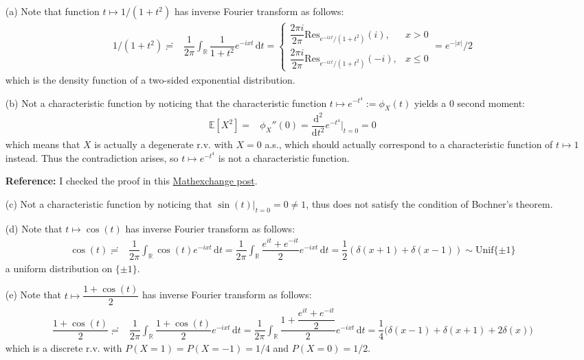 \documentclass[11pt,a4paper]{article}
\numberwithin{equation}{section}%
\begin{document}
\begin{itemize}[topsep=2pt,itemsep=0pt]
    \item[(a)] Note that function $ t\mapsto 1/(1+t^2) $ has inverse Fourier transform as follows:
    \begin{align*}
        1/(1+t^2)\risingdotseq & \dfrac{ 1 }{ 2\pi } \int _\mathbb{R} \dfrac{ 1 }{ 1+t^2 }e^{-ixt}  \,\mathrm{d}t =\begin{cases}
            \dfrac{ 2\pi i }{ 2\pi } \mathrm{ Res }_{e^{-ixt}/(1+t^2)}(i),& x>0\\
            \dfrac{ 2\pi i }{ 2\pi } \mathrm{ Res }_{e^{-ixt}/(1+t^2)}(-i),& x\leq 0
        \end{cases}= e^{-|x|}/2
    \end{align*}
    which is the density function of a two-sided exponential distribution.
    \item[(b)] Not a characteristic function by noticing that the characteristic function $ t\mapsto e^{-t^4} :=\phi_X(t)$ yields a $ 0 $ second moment:
    \begin{align*}
        \mathbb{E}\left[ X^2 \right] = & \phi_X''(0) = \dfrac{ \mathrm{d}^2 }{ \mathrm{d}t^2 }e^{-t^4}\big|_{t=0}=0
    \end{align*}
    which means that $ X $ is actually a degenerate r.v. with $ X=0 $ a.s., which should actually correspond to a characteristic function of $ t\mapsto 1 $ instead. Thus the contradiction arises, so $ t\mapsto e^{-t^4} $ is not a characteristic function.

    \textbf{Reference:} I checked the proof in this \href{https://math.stackexchange.com/questions/1266578/show-that-exp-t4-is-not-a-characteristic-function?noredirect=1&lq=1}{Mathexchange post}.
    
    
    \item[(c)] Not a characteristic function by noticing that $ \sin(t)\big|_{t=0}=0\neq 1 $, thus does not satisfy the condition of Bochner's theorem.
    \item[(d)] Note that $ t\mapsto \cos(t) $ has inverse Fourier transform as follows:
    \begin{align*}
        \cos(t)\risingdotseq & \dfrac{ 1 }{ 2\pi } \int _\mathbb{R} \cos(t)e^{-ixt}  \,\mathrm{d}t =\dfrac{ 1 }{ 2\pi } \int _\mathbb{R} \dfrac{ e^{it}+e^{-it} }{ 2 }e^{-ixt}  \,\mathrm{d}t =\dfrac{ 1 }{ 2 }(\delta (x+1)+\delta (x-1))
        \sim \mathrm{ Unif }\{\pm 1\} 
    \end{align*}
    a uniform distribution on $ \{\pm 1\} $.
    \item[(e)] Note that $ t\mapsto \dfrac{ 1+\cos(t) }{ 2 } $ has inverse Fourier transform as follows:
    \begin{align*}
        \dfrac{ 1+\cos(t) }{ 2 }\risingdotseq & \dfrac{ 1 }{ 2\pi } \int _\mathbb{R} \dfrac{ 1+\cos(t) }{ 2 }e^{-ixt}  \,\mathrm{d}t= \dfrac{ 1 }{ 2\pi } \int _\mathbb{R} \dfrac{ 1+\dfrac{ e^{it}+e^{-it} }{ 2 } }{ 2 }e^{-ixt}  \,\mathrm{d}t= \dfrac{ 1 }{ 4 }\big( \delta (x-1)+\delta (x+1) + 2\delta (x) \big)
    \end{align*}
    which is a discrete r.v. with $ P(X=1)=P(X=-1)=1/4 $ and $ P(X=0)=1/2 $.
\end{itemize}
\end{document}
